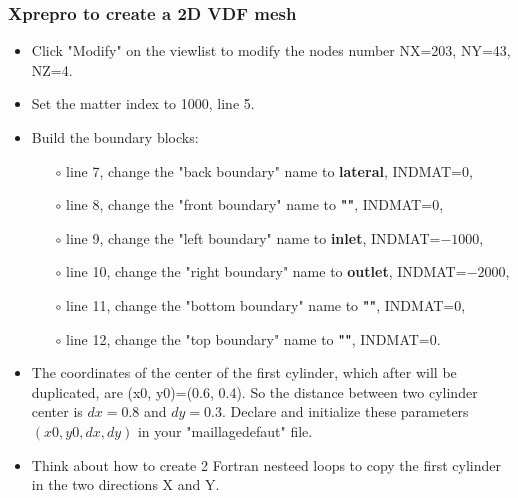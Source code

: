 \documentclass[10pt, hyperref={unicode=true,pdfusetitle, bookmarks=true,bookmarksnumbered=false,bookmarksopen=false, breaklinks=false,pdfborder={0 0 1},backref=true,colorlinks=true,linkcolor=darkblue,pageanchor}]{beamer}
\begin{document}
\begin{frame}
\frametitle{Xprepro to create a 2D VDF mesh}
\begin{block}{}

\begin{itemize}
\item Click "Modify" on the viewlist to modify the nodes number NX=203, NY=43, NZ=4.
\item Set the matter index to 1000, line 5.
\item Build the boundary blocks:
    \begin{itemize}
    \item [$\circ$] line 7, change the "back boundary" name to \textbf{lateral}, INDMAT=$0$,
    \item [$\circ$] line 8, change the "front boundary" name to \textbf{""}, INDMAT=$0$,
    \item [$\circ$] line 9, change the "left boundary" name to \textbf{inlet}, INDMAT=$-1000$,
    \item [$\circ$] line 10, change the "right boundary" name to \textbf{outlet}, INDMAT=$-2000$,
    \item [$\circ$] line 11, change the "bottom boundary" name to \textbf{""}, INDMAT=$0$,
    \item [$\circ$] line 12, change the "top boundary" name to \textbf{""}, INDMAT=$0$.
    \end{itemize}

\item The coordinates of the center of the first cylinder, which after will be duplicated, are (x0, y0)=(0.6, 0.4). So the distance between two cylinder center is $dx=0.8$ and $dy=0.3$. Declare and initialize these parameters $(x0, y0, dx, dy)$ in your "maillagedefaut" file.

\item Think about how to create 2 Fortran nesteed loops to copy the first cylinder in the two directions X and Y.
\end{itemize}

\end{block}
\end{frame}
\end{document}
